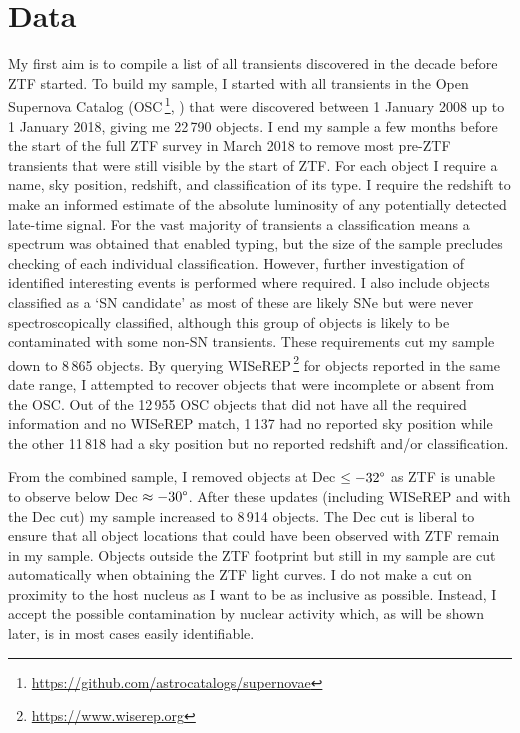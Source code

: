 \documentclass[a4paper,oneside,12pt, class=Latex/Classes/PhDthesisPSnPDF, crop=false]{standalone}
\begin{document}
\section{Data}
\label{Pre-ZTF_data}
My first aim is to compile a list of all transients discovered in the decade before ZTF started. To build my sample, I started with all transients in the Open Supernova Catalog (OSC\,\footnote{\url{https://github.com/astrocatalogs/supernovae}}, \citealt{Open_SN_cat}) that were discovered between 1 January 2008 up to 1 January 2018, giving me 22\,790 objects. I end my sample a few months before the start of the full ZTF survey in March 2018 to remove most pre-ZTF transients that were still visible by the start of ZTF. For each object I require a name, sky position, redshift, and classification of its type. I require the redshift to make an informed estimate of the absolute luminosity of any potentially detected late-time signal. For the vast majority of transients a classification means a spectrum was obtained that enabled typing, but the size of the sample precludes checking of each individual classification. However, further investigation of identified interesting events is performed where required. I also include objects classified as a `SN candidate' as most of these are likely SNe but were never spectroscopically classified, although this group of objects is likely to be contaminated with some non-SN transients. These requirements cut my sample down to 8\,865 objects. By querying WISeREP\,\footnote{\url{https://www.wiserep.org}} \citep{wiserep} for objects reported in the same date range, I attempted to recover objects that were incomplete or absent from the OSC. Out of the 12\,955 OSC objects that did not have all the required information and no WISeREP match, 1\,137 had no reported sky position while the other 11\,818 had a sky position but no reported redshift and/or classification.

From the combined sample, I removed objects at Dec $\leq -32\degree$ as ZTF is unable to observe below Dec $\approx -30\degree$. After these updates (including WISeREP and with the Dec cut) my sample increased to 8\,914 objects. The Dec cut is liberal to ensure that all object locations that could have been observed with ZTF remain in my sample. Objects outside the ZTF footprint but still in my sample are cut automatically when obtaining the ZTF light curves. I do not make a cut on proximity to the host nucleus as I want to be as inclusive as possible. Instead, I accept the possible contamination by nuclear activity which, as will be shown later, is in most cases easily identifiable.
\end{document}
